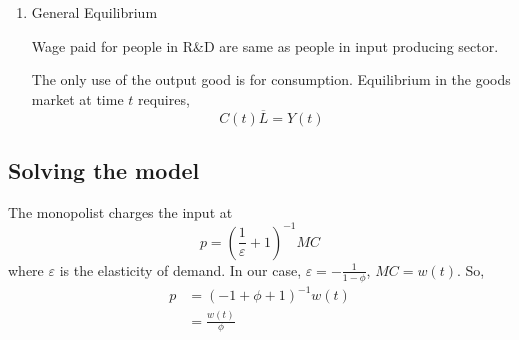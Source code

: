\documentclass[12pt]{article}
\begin{document}
{\begin{enumerate}
		Anyone can higher $ \frac{1}{BA(t)} $ units of labor at wage rate $ w(t) $ and
		produce new idea.

		Hence, the present value of the profit earned from selling the input embodying an
		idea equals the cost of creating it.

		Let $ \pi(i, \tau) $ denote the profits earned by the creator of the idea at
		time $ \tau $.
		\begin{equation*}
		\int_{\tau = t}^{\infty } e^{ - r(\tau - t)}\pi(i,\tau)d \tau = 
		\frac{w(t)}{BA(t)}
		\end{equation*}

\item General Equilibrium

		Wage paid for people in R\&D are same as people in input producing sector.

		The only use of the output good is for consumption. Equilibrium in the goods
		market at time $ t $ requires,
		\begin{equation*}
		C(t) \overline{L} = Y(t)
		\end{equation*}
\end{enumerate}


\subsection{Solving the model}

The monopolist charges the input at 
\begin{equation*}
p = \left( \frac{1}{\varepsilon} + 1 \right) ^{ - 1}MC
\end{equation*}
where $ \varepsilon $ is the elasticity of demand. In our case,
$ \varepsilon =  - \frac{1}{1 - \phi} $, $ MC = w(t) $.
So, 
\begin{align*}
p &= \left(  - 1 + \phi + 1 \right) ^{ - 1}w(t)\\
&= \frac{w(t)}{\phi}
\end{align*}

\noindent{}}
\end{document}
